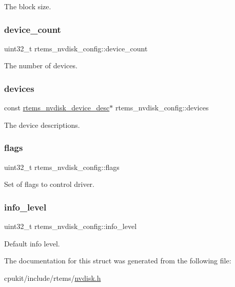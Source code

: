 The block size. \mbox{\label{structrtems__nvdisk__config_a2eea213106e5bf7aec718afa0fc3a6e8}} 
\subsubsection{\texorpdfstring{device\_count}{device\_count}}
{\footnotesize\ttfamily uint32\+\_\+t rtems\+\_\+nvdisk\+\_\+config\+::device\+\_\+count}

The number of devices. \mbox{\label{structrtems__nvdisk__config_afc56006126f8fa423d23d5dd89109753}} 
\subsubsection{\texorpdfstring{devices}{devices}}
{\footnotesize\ttfamily const \mbox{\hyperlink{structrtems__nvdisk__device__desc}{rtems\+\_\+nvdisk\+\_\+device\+\_\+desc}}$\ast$ rtems\+\_\+nvdisk\+\_\+config\+::devices}

The device descriptions. \mbox{\label{structrtems__nvdisk__config_a382c29e7f4f4dc3b698155c104d020ad}} 
\subsubsection{\texorpdfstring{flags}{flags}}
{\footnotesize\ttfamily uint32\+\_\+t rtems\+\_\+nvdisk\+\_\+config\+::flags}

Set of flags to control driver. \mbox{\label{structrtems__nvdisk__config_a2885996e10f6cdf96319ca07c7f22b57}} 
\subsubsection{\texorpdfstring{info\_level}{info\_level}}
{\footnotesize\ttfamily uint32\+\_\+t rtems\+\_\+nvdisk\+\_\+config\+::info\+\_\+level}

Default info level. 

The documentation for this struct was generated from the following file\+:\begin{DoxyCompactItemize}
\item 
cpukit/include/rtems/\mbox{\hyperlink{nvdisk_8h}{nvdisk.\+h}}\end{DoxyCompactItemize}
